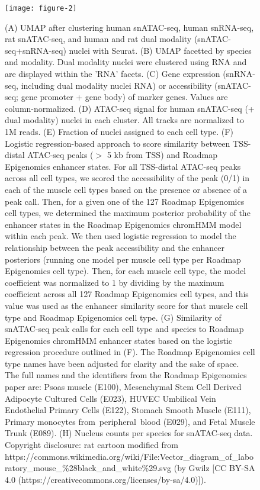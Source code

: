 \documentclass{article}
\begin{document}
\begin{figure}
\texttt{[image: figure-2]}
	\caption{(A) UMAP after clustering human snATAC-seq, human snRNA-seq, rat snATAC-seq, and human and rat dual modality (snATAC-seq+snRNA-seq) nuclei with Seurat. (B) UMAP facetted by species and modality. Dual modality nuclei were clustered using RNA and are displayed within the 'RNA' facets. (C) Gene expression (snRNA-seq, including dual modality nuclei RNA) or accessibility (snATAC-seq; gene promoter + gene body) of marker genes. Values are column-normalized. (D) ATAC-seq signal for human snATAC-seq (+ dual modality) nuclei in each cluster. All tracks are normalized to 1M reads. (E) Fraction of nuclei assigned to each cell type. (F) Logistic regression-based approach to score similarity between TSS-distal ATAC-seq peaks ($>$ 5 kb from TSS) and Roadmap Epigenomics enhancer states. For all TSS-distal ATAC-seq peaks across all cell types, we scored the accessibility of the peak (0/1) in each of the muscle cell types based on the presence or absence of a peak call. Then, for a given one of the 127 Roadmap Epigenomics cell types, we determined the maximum posterior probability of the enhancer states in the Roadmap Epigenomics chromHMM model within each peak. We then used logistic regression to model the relationship between the peak accessibility and the enhancer posteriors (running one model per muscle cell type per Roadmap Epigenomics cell type). Then, for each muscle cell type, the model coefficient was normalized to 1 by dividing by the maximum coefficient across all 127 Roadmap Epigenomics cell types, and this value was used as the enhancer similarity score for that muscle cell type and Roadmap Epigenomics cell type. (G) Similarity of snATAC-seq peak calls for each cell type and species to Roadmap Epigenomics chromHMM enhancer states based on the logistic regression procedure outlined in (F). The Roadmap Epigenomics cell type names have been adjusted for clarity and the sake of space. The full names and the identifiers from the Roadmap Epigenomics paper are: Psoas muscle (E100), Mesenchymal Stem Cell Derived Adipocyte Cultured Cells (E023), HUVEC Umbilical Vein Endothelial Primary Cells (E122), Stomach Smooth Muscle (E111), Primary monocytes from peripheral blood (E029), and Fetal Muscle Trunk (E089). (H) Nucleus counts per species for snATAC-seq data. Copyright disclosure: rat cartoon modified from https://commons.wikimedia.org/wiki/File:Vector\_diagram\_of\_laboratory\_mouse\_\%28black\_and\_white\%29.svg (by Gwilz [CC BY-SA 4.0 (https://creativecommons.org/licenses/by-sa/4.0)]).}
\end{figure}
\end{document}
